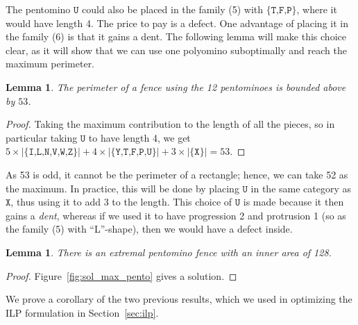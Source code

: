 \documentclass{amsart}
\newtheorem{lemma}[theorem]{Lemma}
\theoremstyle{definition}
\theoremstyle{remark}
\newcommand{\polfont}[1]{\texttt{#1}}
\begin{document}
	The pentomino $\polfont U$ could also be placed in the family (5) with $\{\polfont{T,F,P}\}$, where it would have length 4. The price to pay is a defect. One advantage of placing it in the family (6) is that it gains a dent. The following lemma will make this choice clear, as it will show that we can use one polyomino suboptimally and reach the maximum perimeter.
	
	
	\begin{lemma}\label{lem:perimeter_pentomino}
		The perimeter of a fence using the 12 pentominoes is bounded above by $53$.
	\end{lemma}
	\begin{proof}
		Taking the maximum contribution to the length of all the pieces, so in particular taking $\polfont{U}$ to have length 4, we get $ 5\times |\{\polfont{I,L,N,V,W,Z}\}|+4\times|\{\polfont{Y,T,F,P,U}\}| + 3\times|\{\polfont{X}\}| = 53$.
	\end{proof}
	As 53 is odd, it cannot be the perimeter of a rectangle; hence, we can take 52 as the maximum. In practice, this will be done by placing $\polfont{U}$ in the same category as $\polfont X$, thus using it to add $3$ to the length. This choice of $\polfont{U}$ is made because it then gains a \textit{dent}, whereas if we used it to have progression 2 and protrusion 1 (so as the family (5) with ``L''-shape), then we would have a defect inside.
	
	
	\begin{lemma}\label{lem:maxsol_square}
		There is an extremal pentomino fence with an inner area of 128. 
	\end{lemma}
	\begin{proof}
		Figure~\ref{fig:sol_max_pento} gives a solution.
	\end{proof}
	
	We prove a corollary of the two previous results, which we used in optimizing the ILP formulation in Section~\ref{sec:ilp}.
	
\end{document}
